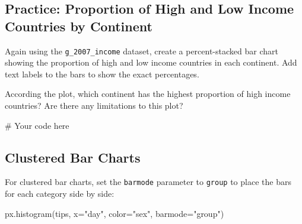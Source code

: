 \documentclass[
  letterpaper,
  DIV=11,
  numbers=noendperiod]{scrreprt}
\newenvironment{Shaded}{\begin{snugshade}}{\end{snugshade}}
\newcommand{\CommentTok}[1]{\textcolor[rgb]{0.37,0.37,0.37}{#1}}
\newcommand{\NormalTok}[1]{\textcolor[rgb]{0.00,0.23,0.31}{#1}}
\newcommand{\OperatorTok}[1]{\textcolor[rgb]{0.37,0.37,0.37}{#1}}
\newcommand{\StringTok}[1]{\textcolor[rgb]{0.13,0.47,0.30}{#1}}
\begin{document}
\begin{tcolorbox}[enhanced jigsaw, colframe=quarto-callout-tip-color-frame, opacityback=0, titlerule=0mm, bottomrule=.15mm, breakable, leftrule=.75mm, colbacktitle=quarto-callout-tip-color!10!white, title=\textcolor{quarto-callout-tip-color}{\faLightbulb}\hspace{0.5em}{Practice}, rightrule=.15mm, coltitle=black, opacitybacktitle=0.6, colback=white, left=2mm, arc=.35mm, toptitle=1mm, bottomtitle=1mm, toprule=.15mm]

\subsection{Practice: Proportion of High and Low Income Countries by
Continent}\label{practice-proportion-of-high-and-low-income-countries-by-continent}

Again using the \texttt{g\_2007\_income} dataset, create a
percent-stacked bar chart showing the proportion of high and low income
countries in each continent. Add text labels to the bars to show the
exact percentages.

According the plot, which continent has the highest proportion of high
income countries? Are there any limitations to this plot?

\begin{Shaded}
\begin{Highlighting}[]
\CommentTok{\# Your code here}
\end{Highlighting}
\end{Shaded}

\end{tcolorbox}

\subsection{Clustered Bar Charts}\label{clustered-bar-charts}

For clustered bar charts, set the \texttt{barmode} parameter to
\texttt{\textquotesingle{}group\textquotesingle{}} to place the bars for
each category side by side:

\begin{Shaded}
\begin{Highlighting}[]
\NormalTok{px.histogram(tips, x}\OperatorTok{=}\StringTok{"day"}\NormalTok{, color}\OperatorTok{=}\StringTok{"sex"}\NormalTok{, barmode}\OperatorTok{=}\StringTok{"group"}\NormalTok{)}
\end{Highlighting}
\end{Shaded}
\end{document}
